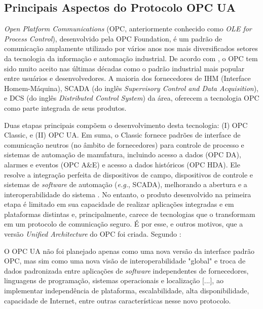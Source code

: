     \subsection{Principais Aspectos do Protocolo OPC UA} \label{subsec:opcUA}

        \textit{Open Platform Communications} (OPC, anteriormente conhecido como \textit{OLE for Process Control}), desenvolvido pela OPC Foundation, é um padrão de comunicação amplamente utilizado por vários anos nos mais diversificados setores da tecnologia da informação e automação industrial. De acordo com , o OPC tem sido muito aceito nas últimas décadas como o padrão industrial mais popular entre usuários e desenvolvedores. A maioria dos fornecedores de IHM (Interface Homem-Máquina), SCADA (do inglês \textit{Supervisory Control and Data Acquisition}), e DCS (do inglês \textit{Distributed Control System}) da área, oferecem a tecnologia OPC como parte integrada de seus produtos.
        
        Duas etapas principais compõem o desenvolvimento desta tecnologia: (I) OPC Classic, e (II) OPC UA. Em suma, o Classic fornece padrões de interface de comunicação neutros (no âmbito de fornecedores) para controle de processo e sistemas de automação de manufatura, incluindo acesso a dados (OPC DA), alarmes e eventos (OPC A\&E) e acesso a dados históricos (OPC HDA). Ele resolve a integração perfeita de dispositivos de campo, dispositivos de controle e sistemas de \textit{software} de automação (\textit{e.g.}, SCADA), melhorando a abertura e a interoperabilidade do sistema \cite{han2022}. No entanto, o produto desenvolvido na primeira etapa é limitado em sua capacidade de realizar aplicações integradas e em plataformas distintas e, principalmente, carece de tecnologias que o transformam em um protocolo de comunicação seguro. É por esse, e outros motivos, que a versão \textit{Unified Architecture} do OPC foi criada. Segundo :
    
        \begin{citacao}
            O OPC UA não foi planejado apenas como uma nova versão da interface padrão OPC, mas sim como uma nova visão de interoperabilidade "global" e troca de dados padronizada entre aplicações de \textit{software} independentes de fornecedores, linguagens de programação, sistemas operacionais e localização [...], ao implementar independência de plataforma, escalabilidade, alta disponibilidade, capacidade de Internet, entre outras características nesse novo protocolo.
        \end{citacao}
    
